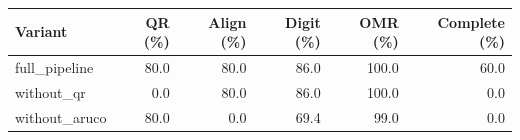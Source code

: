 \begin{tabular}{lrrrrr}
\toprule
Variant & QR (\%) & Align (\%) & Digit (\%) & OMR (\%) & Complete (\%) \\
\midrule
full\_pipeline & 80.0 & 80.0 & 86.0 & 100.0 & 60.0 \\
without\_qr & 0.0 & 80.0 & 86.0 & 100.0 & 0.0 \\
without\_aruco & 80.0 & 0.0 & 69.4 & 99.0 & 0.0 \\
\bottomrule
\end{tabular}
